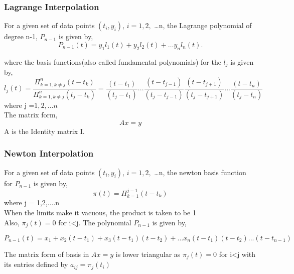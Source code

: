 \documentclass[12pt]{article}
\begin{document}
\subsubsection{Lagrange Interpolation}

For a given set of data points $(t_i,y_i)$, $i = 1,2,$ \dots n, the Lagrange polynomial of degree n-1, $P_{n-1}$ is given by,
\begin{equation*}
P_{n-1} (t) = y_1 l_1 (t) + y_2 l_2(t) + \dots y_n l_n (t).
\end{equation*}

where the basis functions(also called fundamental polynomials) for the $l_j$ is given by,
\begin{equation*}
l_j (t) =  \frac{ \Pi _{k=1, k\neq j} ^n (t - t_k)} {\Pi _{k=1,k \neq j} ^ n (t_j - t_k)} = \frac{(t - t_1)}{(t_j - t_1)}...\frac{(t - t_{j-1})}{(t_j - t_{j-1})}\frac{(t - t_{j+1})}{(t_j - t_{j+1})}... \frac{(t - t_n)}{(t_j - t_n)}
\end{equation*}
where j =$ 1,2,... n$\\
The matrix form, 
\begin{equation*}
Ax = y
\end{equation*}
A is the Identity matrix I.
\subsubsection{Newton Interpolation}

For a given set of data points $(t_i,y_i)$, $i = 1,2,$ \dots n, the newton basis function for $P_{n-1}$ is given by,
\begin{equation*}
\pi(t) = \Pi_{k=1}^{j-1} (t - t_k) 
\end{equation*}
where j = 1,2,....n\\
When the limits make it vacuous, the product is taken to be 1\\
Also, $\pi_j (t) = 0$ for i<j.
The polynomial $P_{n-1}$ is given by,

\begin{equation*}
P_{n-1} (t) = x_1 + x_2(t-t_1) + x_3(t-t_1)(t-t_2) + ... x_n(t-t_1)(t-t_2)...(t-t_{n-1})
\end{equation*}

The matrix form of basis in $Ax = y$ is lower triangular as $\pi_j (t) = 0$ for i<j with its entries defined by $a_{ij} = \pi_j (t_i)$
\end{document}
